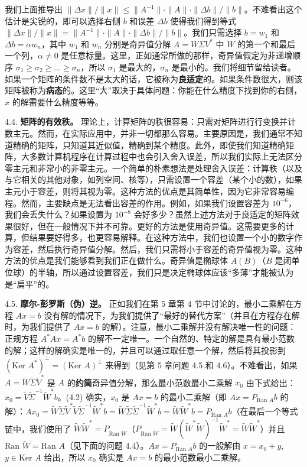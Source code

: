 我们上面推导出 $\| \Delta x \| / \| x \| \leq \| A^{-1} \| \cdot \| A \| \cdot \| \Delta b \| / \| b \|$。不难看出这个估计是尖锐的，即可以选择右侧 $b$ 和误差 $\Delta b$ 使得我们得到等式 $\| \Delta x \| / \| x \| = \| A^{-1} \| \cdot \| A \| \cdot \| \Delta b \| / \| b \|$。我们只需选择 $b = w_1$ 和 $\Delta b = \alpha w_n$，其中 $w_1$ 和 $w_n$ 分别是奇异值分解 $A = W \Sigma V^*$ 中 $W$ 的第一个和最后一个列，$\alpha \neq 0$ 是任意标量。这里，正如通常所做的那样，奇异值假定为非递增顺序 $\sigma_1 \geq \sigma_2 \geq \dots \geq \sigma_n$，所以 $\sigma_1$ 是最大的，$\sigma_n$ 是最小的。我们将细节留给读者。如果一个矩阵的条件数不是太大的话，它被称为\textbf{良适定}的。如果条件数很大，则该矩阵被称为\textbf{病态}的。这里“大”取决于具体问题：你能在什么精度下找到你的右侧，$x$ 的解需要什么精度等等。

4.4. \textbf{矩阵的有效秩。} 理论上，计算矩阵的秩很容易：只需对矩阵进行行变换并计数主元。然而，在实际应用中，并非一切都那么容易。主要原因是，我们通常不知道精确的矩阵，只知道其近似值，精确到某个精度。此外，即使我们知道精确矩阵，大多数计算机程序在计算过程中也会引入舍入误差，所以我们实际上无法区分零主元和非常小的非零主元。一个简单的朴素想法是处理舍入误差：计算秩（以及与它相关的其他对象，如列空间、核等），只需设置一个容差（某个小的数），如果主元小于容差，则将其视为零。这种方法的优点是其简单性，因为它非常容易编程。然而，主要缺点是无法看出容差的作用。例如，如果我们设置容差为 $10^{-6}$，我们会丢失什么？如果设置为 $10^{-8}$ 会好多少？虽然上述方法对于良适定的矩阵效果很好，但在一般情况下并不可靠。更好的方法是使用奇异值。这需要更多的计算，但结果要好得多，也更容易解释。在这种方法中，我们也设置一个小的数字作为容差，然后执行奇异值分解。然后，我们只需将小于容差的奇异值视为零。这种方法的优点是我们能够看到我们正在做什么。奇异值是椭球体 $A(B)$（$B$ 是闭单位球）的半轴，所以通过设置容差，我们只是决定椭球体应该“多薄”才能被认为是“扁平”的。

4.5. \textbf{摩尔-彭罗斯（伪）逆。} 正如我们在第 5 章第 4 节中讨论的，最小二乘解在方程 $Ax = b$ 没有解的情况下，为我们提供了“最好的替代方案”（并且在方程存在解时，为我们提供了 $Ax = b$ 的解）。注意，最小二乘解并没有解决唯一性的问题：正规方程 $A^*Ax = A^*b$ 的解不一定唯一。一个自然的、特定的解是具有最小范数的解；这样的解确实是唯一的，并且可以通过取任意一个解，然后将其投影到 $(\text{Ker } A^*)^\perp = (\text{Ker } A)^\perp$ 来得到（见第 5 章问题 4.5 和 4.6）。不难看出，如果 $A = \tilde{W} \tilde{\Sigma} \tilde{V}^*$ 是 $A$ 的\textbf{约简}奇异值分解，那么最小范数最小二乘解 $x_0$ 由下式给出：
$x_0 = \tilde{V} \tilde{\Sigma}^{-1} \tilde{W}^* b$。(4.2)
确实，$x_0$ 是 $Ax = b$ 的最小二乘解（即 $Ax = P_{\text{Ran } A} b$ 的解）：$Ax_0 = \tilde{W} \tilde{\Sigma} \tilde{V}^* \tilde{V} \tilde{\Sigma}^{-1} \tilde{W}^* b = \tilde{W} \tilde{\Sigma} \tilde{\Sigma}^{-1} \tilde{W}^* b = \tilde{W} \tilde{W}^* b = P_{\text{Ran } A} b$（在最后一个等式链中，我们使用了 $\tilde{W} \tilde{W}^* = P_{\text{Ran } \tilde{W}}$（$P_{\text{Ran } \tilde{W}} = \tilde{W}(\tilde{W}^*\tilde{W})^{-1}\tilde{W}^* = \tilde{W}\tilde{W}^*$）并且 $\text{Ran } \tilde{W} = \text{Ran } A$（见下面的问题 4.4）。$Ax = P_{\text{Ran } A} b$ 的一般解由 $x = x_0 + y$, $y \in \text{Ker } A$ 给出，所以 $x_0$ 确实是 $Ax = b$ 的最小范数最小二乘解。

